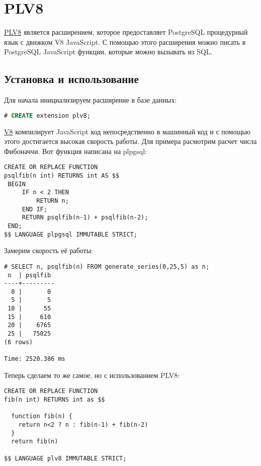 \section{PLV8}

\href{https://github.com/plv8/plv8}{PLV8} является расширением, которое предоставляет PostgreSQL процедурный язык с движком V8 JavaScript. С помощью этого расширения можно писать в PostgreSQL JavaScript функции, которые можно вызывать из SQL.

\subsection{Установка и использование}

Для начала инициализируем расширение в базе данных:

\begin{lstlisting}[language=SQL,label=lst:plv8jsinit,caption=Инициализация plv8]
# CREATE extension plv8;
\end{lstlisting}

\href{http://en.wikipedia.org/wiki/V8\_(JavaScript\_engine)}{V8} компилирует JavaScript код непосредственно в машинный код и с помощью этого достигается высокая скорость работы. Для примера расмотрим расчет числа Фибоначчи. Вот функция написана на plpgsql:

\begin{lstlisting}[label=lst:plv8js1,caption=Фибоначчи на plpgsql]
CREATE OR REPLACE FUNCTION
psqlfib(n int) RETURNS int AS $$
 BEGIN
     IF n < 2 THEN
         RETURN n;
     END IF;
     RETURN psqlfib(n-1) + psqlfib(n-2);
 END;
$$ LANGUAGE plpgsql IMMUTABLE STRICT;
\end{lstlisting}

Замерим скорость её работы:

\begin{lstlisting}[label=lst:plv8js2,caption=Скорость расчета числа Фибоначчи на plpgsql]
# SELECT n, psqlfib(n) FROM generate_series(0,25,5) as n;
 n  | psqlfib
----+---------
  0 |       0
  5 |       5
 10 |      55
 15 |     610
 20 |    6765
 25 |   75025
(6 rows)

Time: 2520.386 ms
\end{lstlisting}

Теперь сделаем то же самое, но с использованием PLV8:

\begin{lstlisting}[label=lst:plv8js3,caption=Фибоначчи на plv8]
CREATE OR REPLACE FUNCTION
fib(n int) RETURNS int as $$

  function fib(n) {
    return n<2 ? n : fib(n-1) + fib(n-2)
  }
  return fib(n)

$$ LANGUAGE plv8 IMMUTABLE STRICT;
\end{lstlisting}

